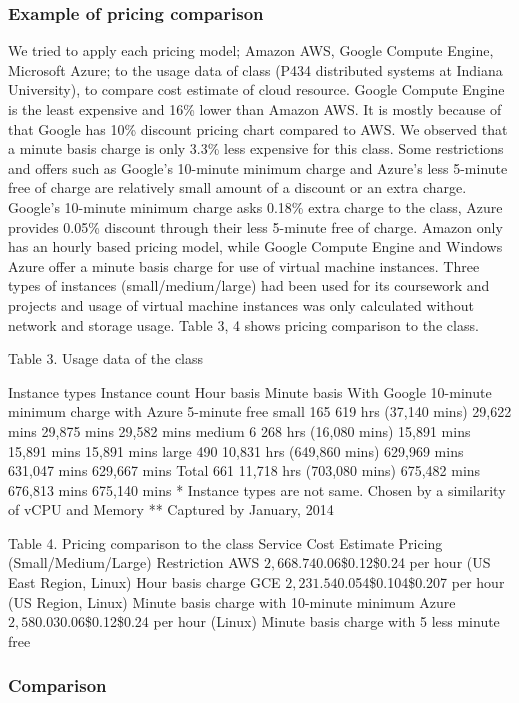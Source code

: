 \documentclass{sig-alternate}
\begin{document}
\subsubsection{Example of pricing comparison}

We tried to apply each pricing model; Amazon AWS, Google Compute Engine, Microsoft Azure; to the usage data of class (P434 distributed systems at Indiana University), to compare cost estimate of cloud resource. Google Compute Engine is the least expensive and 16\% lower than Amazon AWS. It is mostly because of that Google has 10\% discount pricing chart compared to AWS. We observed that a minute basis charge is only 3.3\% less expensive for this class. Some restrictions and offers such as Google's 10-minute minimum charge and Azure's less 5-minute free of charge are relatively small amount of a discount or an extra charge. Google's 10-minute minimum charge asks 0.18\% extra charge to the class, Azure provides 0.05\% discount through their less 5-minute free of charge. Amazon only has an hourly based pricing model, while Google Compute Engine and Windows Azure offer a minute basis charge for use of virtual machine instances. Three types of instances (small/medium/large) had been used for its coursework and projects and usage of virtual machine instances was only calculated without network and storage usage. Table 3, 4 shows pricing comparison to the class.

Table 3. Usage data of the class

Instance types	Instance count	Hour basis	Minute basis	With Google 10-minute minimum charge	with Azure 5-minute free
small	165	619 hrs (37,140 mins)	29,622 mins	29,875 mins	29,582 mins
medium	6	268 hrs (16,080 mins)	15,891 mins	15,891 mins	15,891 mins
large	490	10,831 hrs (649,860 mins)	629,969 mins	631,047 mins	629,667 mins
Total	661	11,718 hrs (703,080 mins)	675,482 mins	676,813 mins	675,140 mins
* Instance types are not same. Chosen by a similarity of vCPU and Memory
** Captured by January, 2014

Table 4. Pricing comparison to the class
Service	Cost Estimate	Pricing (Small/Medium/Large)	Restriction
AWS	$2,668.74	$0.06\$0.12\$0.24 per hour (US East Region, Linux)	Hour basis charge
GCE	$2,231.54	$0.054\$0.104\$0.207 per hour (US Region, Linux)	Minute basis charge with 10-minute minimum
Azure	$2,580.03	$0.06\$0.12\$0.24 per hour (Linux)	Minute basis charge with 5 less minute free

\subsubsection{Comparison}
\end{document}

